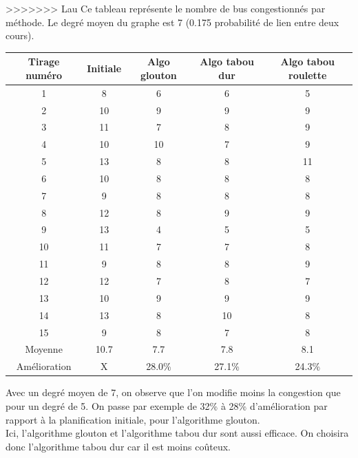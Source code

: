 \documentclass[a4paper,11pt]{article}
\begin{document}
>>>>>>> Lau
	\newpage
	Ce tableau représente le nombre de bus congestionnés par méthode. Le degré moyen du graphe est 7 (0.175 probabilité de lien entre deux cours).\\ 
	\begin{tabular}{|c|c|c|c|c|}
  		\hline
  		Tirage numéro & Initiale & Algo glouton & Algo tabou dur & Algo tabou roulette\\
  		\hline
  		1 & 8 & 6 & 6 & 5\\
  		\hline
  		2 & 10 & 9 & 9 & 9\\
  		\hline
  		3 & 11 & 7 & 8 & 9\\
  		\hline
  		4 & 10 & 10 & 7 & 9\\
  		\hline
  		5 & 13 & 8 & 8 & 11\\
  		\hline
  		6 & 10 & 8 & 8 & 8\\
  		\hline
  		7 & 9 & 8 & 8 & 8\\
  		\hline
  		8 & 12 & 8 & 9 & 9\\
  		\hline
  		9 & 13 & 4 & 5 & 5\\
  		\hline
  		10 & 11 & 7 & 7 & 8\\
  		\hline
  		11 & 9 & 8 & 8 & 9\\
  		\hline
  		12 & 12 & 7 & 8 & 7\\
  		\hline
  		13 & 10 & 9 & 9 & 9\\
  		\hline
  		14 & 13 & 8 & 10 & 8\\
  		\hline
  		15 & 9 & 8 & 7 & 8\\
  		\hline
  		Moyenne & 10.7 & 7.7 & 7.8 & 8.1\\
  		\hline
  		Amélioration & X & 28.0\% & 27.1\% & 24.3\%\\
  		\hline
	\end{tabular}
	Avec un degré moyen de 7, on observe que l'on modifie moins la congestion que pour un degré de 5. On passe par exemple de 32\% à 28\% d'amélioration par rapport à la planification initiale, pour l'algorithme glouton.\\
	Ici, l'algorithme glouton et l'algorithme tabou dur sont aussi efficace. On choisira donc l'algorithme tabou dur car il est moins coûteux. 
\end{document}
